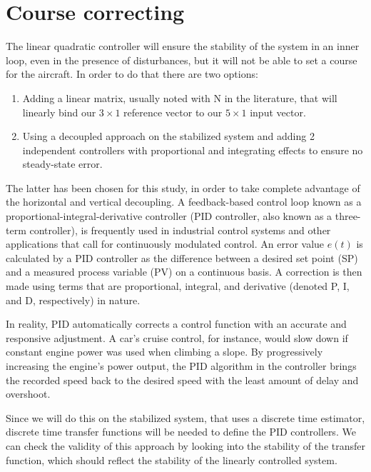 \documentclass[twocolumn,showpacs,
    nofootinbib,aps,superscriptaddress,
    eqsecnum,prd,showkeys,10pt,floatfix]{revtex4}
\begin{document}
\section{Course correcting}
The linear quadratic controller will ensure the stability of the system in an inner loop, even in the presence of disturbances, but it will not be able to set a course for the aircraft. In order to do that there are two options:
\par
\begin{enumerate}
    \item Adding a linear matrix, usually noted with N in the literature, that will
          linearly bind our $3\times1$ reference vector to our $5\times1$ input vector.
    \item Using a decoupled approach on the stabilized system and adding 2 independent
          controllers with proportional and integrating effects to ensure no steady-state
          error.
\end{enumerate}
\par
The latter has been chosen for this study, in order to take complete advantage of the horizontal and vertical decoupling. A feedback-based control loop known as a
proportional-integral-derivative controller (PID controller, also known as a
three-term controller), is frequently used in industrial control systems and
other applications that call for continuously modulated control. An error value
$e(t)$ is calculated by a PID controller as the difference between a desired set
point (SP) and a measured process variable (PV) on a continuous basis. A
correction is then made using terms that are proportional, integral, and
derivative (denoted P, I, and D, respectively) in nature.
\par
In reality, PID automatically corrects a control function with an accurate and
responsive adjustment. A car's cruise control, for instance, would slow down if
constant engine power was used when climbing a slope. By progressively
increasing the engine's power output, the PID algorithm in the controller
brings the recorded speed back to the desired speed with the least amount of
delay and overshoot.
\par
Since we will do this on the stabilized system, that uses a discrete time
estimator, discrete time transfer functions will be needed to define the PID controllers. We can check the
validity of this approach by looking into the stability of the transfer
function, which should reflect the stability of the linearly controlled system.
\par
\end{document}
